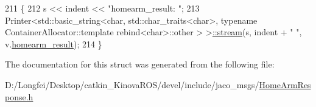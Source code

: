 \begin{DoxyCode}
211   \{
212     s << indent << \textcolor{stringliteral}{"homearm\_result: "};
213     Printer<std::basic\_string<char, std::char\_traits<char>, \textcolor{keyword}{typename} ContainerAllocator::template 
      rebind<char>::other > >\hyperlink{structros_1_1message__operations_1_1Printer_3_01_1_1jaco__msgs_1_1HomeArmResponse___3_01ContainerAllocator_01_4_01_4_aacf5429780e888a2d85e534a5353adcf}{::stream}(s, indent + \textcolor{stringliteral}{"  "}, v.\hyperlink{structjaco__msgs_1_1HomeArmResponse___a2efd00ce949c689141e24a0c2feac589}{homearm\_result});
214   \}
\end{DoxyCode}


The documentation for this struct was generated from the following file\+:\begin{DoxyCompactItemize}
\item 
D\+:/\+Longfei/\+Desktop/catkin\+\_\+\+Kinova\+R\+O\+S/devel/include/jaco\+\_\+msgs/\hyperlink{HomeArmResponse_8h}{Home\+Arm\+Response.\+h}\end{DoxyCompactItemize}
